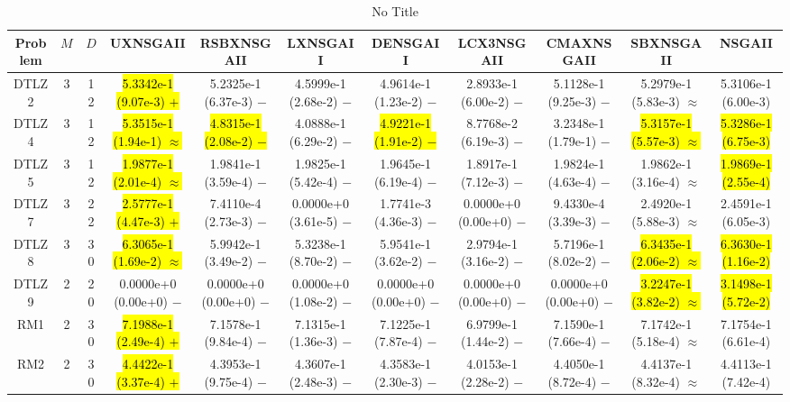 \documentclass[journal]{IEEEtran}
\begin{document}
\begin{table*}[htbp]
\renewcommand{\arraystretch}{1.2}
\centering
\caption{No Title}
\begin{tabular}{ccccccccccc}
\toprule
Problem&$M$&$D$&UXNSGAII&RSBXNSGAII&LXNSGAII&DENSGAII&LCX3NSGAII&CMAXNSGAII&SBXNSGAII&NSGAII\\
\midrule
\multirow{1}{*}{DTLZ2}&3&12&\hl{5.3342e-1 (9.07e-3) $+$}&5.2325e-1 (6.37e-3) $-$&4.5999e-1 (2.68e-2) $-$&4.9614e-1 (1.23e-2) $-$&2.8933e-1 (6.00e-2) $-$&5.1128e-1 (9.25e-3) $-$&5.2979e-1 (5.83e-3) $\approx$&5.3106e-1 (6.00e-3)\\
\hline
\multirow{1}{*}{DTLZ4}&3&12&\hl{5.3515e-1 (1.94e-1) $\approx$}&\hl{4.8315e-1 (2.08e-2) $-$}&4.0888e-1 (6.29e-2) $-$&\hl{4.9221e-1 (1.91e-2) $-$}&8.7768e-2 (6.19e-3) $-$&3.2348e-1 (1.79e-1) $-$&\hl{5.3157e-1 (5.57e-3) $\approx$}&\hl{5.3286e-1 (6.75e-3)}\\
\hline
\multirow{1}{*}{DTLZ5}&3&12&\hl{1.9877e-1 (2.01e-4) $\approx$}&1.9841e-1 (3.59e-4) $-$&1.9825e-1 (5.42e-4) $-$&1.9645e-1 (6.19e-4) $-$&1.8917e-1 (7.12e-3) $-$&1.9824e-1 (4.63e-4) $-$&1.9862e-1 (3.16e-4) $\approx$&\hl{1.9869e-1 (2.55e-4)}\\
\hline
\multirow{1}{*}{DTLZ7}&3&22&\hl{2.5777e-1 (4.47e-3) $+$}&7.4110e-4 (2.73e-3) $-$&0.0000e+0 (3.61e-5) $-$&1.7741e-3 (4.36e-3) $-$&0.0000e+0 (0.00e+0) $-$&9.4330e-4 (3.39e-3) $-$&2.4920e-1 (5.88e-3) $\approx$&2.4591e-1 (6.05e-3)\\
\hline
\multirow{1}{*}{DTLZ8}&3&30&\hl{6.3065e-1 (1.69e-2) $\approx$}&5.9942e-1 (3.49e-2) $-$&5.3238e-1 (8.70e-2) $-$&5.9541e-1 (3.62e-2) $-$&2.9794e-1 (3.16e-2) $-$&5.7196e-1 (8.02e-2) $-$&\hl{6.3435e-1 (2.06e-2) $\approx$}&\hl{6.3630e-1 (1.16e-2)}\\
\hline
\multirow{1}{*}{DTLZ9}&2&20&0.0000e+0 (0.00e+0) $-$&0.0000e+0 (0.00e+0) $-$&0.0000e+0 (1.08e-2) $-$&0.0000e+0 (0.00e+0) $-$&0.0000e+0 (0.00e+0) $-$&0.0000e+0 (0.00e+0) $-$&\hl{3.2247e-1 (3.82e-2) $\approx$}&\hl{3.1498e-1 (5.72e-2)}\\
\hline
\multirow{1}{*}{RM1}&2&30&\hl{7.1988e-1 (2.49e-4) $+$}&7.1578e-1 (9.84e-4) $-$&7.1315e-1 (1.36e-3) $-$&7.1225e-1 (7.87e-4) $-$&6.9799e-1 (1.44e-2) $-$&7.1590e-1 (7.66e-4) $-$&7.1742e-1 (5.18e-4) $\approx$&7.1754e-1 (6.61e-4)\\
\hline
\multirow{1}{*}{RM2}&2&30&\hl{4.4422e-1 (3.37e-4) $+$}&4.3953e-1 (9.75e-4) $-$&4.3607e-1 (2.48e-3) $-$&4.3583e-1 (2.30e-3) $-$&4.0153e-1 (2.28e-2) $-$&4.4050e-1 (8.72e-4) $-$&4.4137e-1 (8.32e-4) $\approx$&4.4113e-1 (7.42e-4)\\

\end{tabular}
\end{table*}
\end{document}
